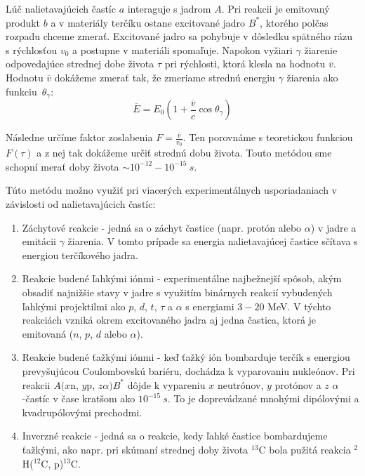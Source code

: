 \documentclass[../../main.tex]{subfiles}
\begin{document}
Lúč nalietavajúcich častíc $a$ interaguje s jadrom $A$. Pri reakcii je emitovaný produkt $b$ a v materiály terčíku ostane excitované jadro $B^*$, ktorého polčas rozpadu chceme zmerať. Excitované jadro sa pohybuje v dôsledku spätného rázu s rýchlosťou $v_0$ a postupne v materiáli spomaľuje. Napokon vyžiari $\gamma$ žiarenie odpovedajúce strednej dobe života $\tau$ pri rýchlosti, ktorá klesla na hodnotu $\overline{v}$. Hodnotu $\overline{v}$ dokážeme zmerať tak, že zmeriame strednú energiu $\gamma$ žiarenia ako funkciu~$\theta_\gamma$:
\begin{equation}
\overline{E}=E_0\left(1+\frac{\overline{v}}{c}\cos \theta_\gamma\right)
\end{equation}

Následne určíme faktor zoslabenia $F=\frac{\overline{v}}{v_0}$. Ten porovnáme s teoretickou funkciou $F(\tau)$ a z nej tak dokážeme určiť strednú dobu života. Touto metódou sme schopní merať doby života $\sim 10^{-12}-10^{-15}\:\unit{s}$.

Túto metódu možno využiť pri viacerých experimentálnych usporiadaniach v závislosti od nalietavajúcich častíc:
\begin{enumerate}
\item Záchytové reakcie - jedná sa o záchyt častice (napr. protón alebo $\alpha$) v jadre a emitácii $\gamma$ žiarenia. V tomto prípade sa energia nalietavajúcej častice sčítava s energiou terčíkového jadra.

\item Reakcie budené ľahkými iónmi - experimentálne najbežnejší spôsob, akým obsadiť najnižšie stavy v jadre s využitím binárnych reakcií vybudených ľahkými projektilmi ako $p$, $d$, $t$, $\tau$ a $\alpha$ s energiami $3-20$ MeV. V týchto reakciách vzniká okrem excitovaného jadra aj jedna častica, ktorá je emitovaná ($n$, $p$, $d$ alebo $\alpha$).

\item Reakcie budené ťažkými iónmi - keď ťažký ión bombarduje terčík s energiou prevyšujúcou Coulombovskú bariéru, dochádza k vyparovaniu nukleónov. Pri reakcii $A(x$n, $y$p, $z\alpha )B^*$ dôjde k vypareniu $x$ neutrónov, $y$ protónov a $z$ $\alpha$-častíc v čase kratšom ako $10^{-15}\:\unit{s}$. To je doprevádzané mnohými dipólovými a kvadrupólovými prechodmi.

\item Inverzné reakcie - jedná sa o reakcie, kedy ľahké častice bombardujeme ťažkými, ako napr. pri skúmaní strednej doby života $^{13}$C bola pužitá reakcia $^2$H($^{12}$C, p)$^{13}$C.
\end{enumerate}
\end{document}
